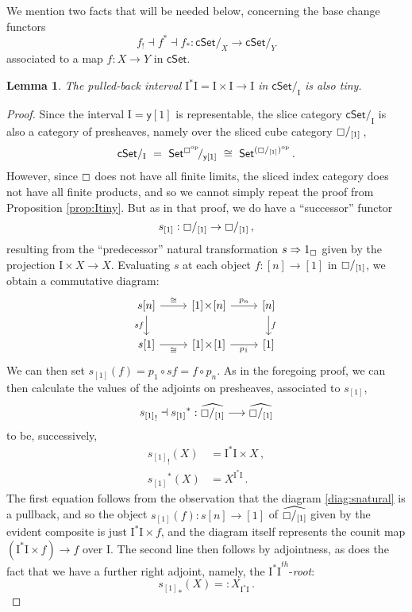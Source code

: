 \documentclass[11pt]{amsart}
\newcommand{\C}{\ensuremath{\boxempty}}
\newcommand{\psh}[1]{\ensuremath{\mathsf{Set}^{#1^{\mathrm{op}}}}}
\newcommand{\cSet}{\ensuremath{\mathsf{cSet}}}
\newcommand{\y}{\ensuremath{\mathsf{y}}} %
\renewcommand{\to}{\ensuremath{\rightarrow}}
\newcommand{\too}{\ensuremath{\longrightarrow}}
\newcommand{\I}{\ensuremath{\mathrm{I}}}
\newtheorem{lemma}[theorem]{Lemma}
\theoremstyle{remark}
\theoremstyle{definition}
\begin{document}
We mention two facts that will be needed below, concerning the base change functors 
\[
f_!\dashv f^* \dashv f_* : \cSet/_X \too \cSet/_Y
\]
associated to a map $f : X\to Y$  in $\cSet$.

\begin{lemma}\label{lemma:tinyslicedI}
The pulled-back interval $\I^*\I = \I\times\I\to \I$ in $\cSet/_\I$ is also tiny.
\end{lemma}
\begin{proof}
Since the interval $\I = \y[1]$ is representable, the slice category $\cSet/_\I$ is also a category of presheaves, namely over the sliced cube category $\C/_{[1]}$\,,
\[
\cSet/_\I \ =\ {\psh{\C}}\!/_{\y[1]} \ \cong\ \psh{ (\C/_{[1]}) }\,.
\]
However, since $\C$ does not have all finite limits, the sliced index category does not have all finite products, and so we cannot simply repeat the proof from Proposition \ref{prop:Itiny}.  But as in that proof, we do have a ``successor'' functor 
\[
s_{[1]} : \C/_{[1]} \to \C/_{[1]}\,,
\]
resulting from the ``predecessor'' natural transformation $s \Rightarrow 1_\C$ given by the  projection $\I\times X \to X$. Evaluating $s$ at each object $f : [n] \to [1]$ in  $\C/_{[1]}$, we obtain a commutative diagram:
\begin{equation}\label{diag:snatural}
\begin{tikzcd}
s[n]  \ar[d,swap, "{sf}"] \ar[r, "{\cong}" ] & {[1]}\!\times\! {[n]}  \ar[r, "p_n"] & {[n]} \ar[d, "f"] \\  
s[1]  \ar[r, swap, "{\cong}" ] & {[1]}\!\times\! {[1]}  \ar[r, swap, "p_1"] & {[1]}
 \end{tikzcd}
 \end{equation}
We can then set $s_{[1]}(f) = p_1\circ sf = f\circ p_n$. As in the foregoing proof, we can then calculate the values of the adjoints on presheaves, associated to $s_{[1]}$,
 \[
 {s_{[1]}}_! \dashv {s_{[1]}}^* : \widehat{\C/_{[1]}} \too \widehat{\C/_{[1]}} \]
  to be, successively,
 \begin{align*}
 {s_{[1]}}_! (X) &= \I^*\I \times X\,, \\
  {s_{[1]}}^* (X) &= X^{\I^*\I} \,.
 \end{align*}
The first equation follows from the observation that the diagram \eqref{diag:snatural} is a pullback, and so the object $s_{[1]}(f)  : s[n]\to [1]$ of $\widehat{\C/_{[1]}}$ given by the evident composite is just $\I^*\I \times f $, and the diagram itself represents the counit map $(\I^*\I \times f) \to f$ over $\I$.
 The second line then follows by adjointness, as does the fact that we have a further right adjoint, namely, the ${\I^*\I}^{th}$-\emph{root}:
 \begin{equation*}
 {s_{[1]}}_* (X) =: X_{\I^*\I} \,.
 \end{equation*}
\end{proof}
\end{document}
